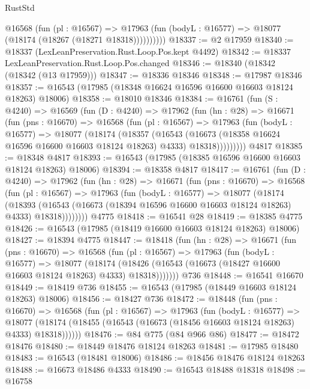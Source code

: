\begin{lexlean}{RustStd}
\begin{coremodule}
            @16568
              (fun (pl : @16567) =>
              @17963 (fun (bodyL : @16577) => @18077 (@18174 (@18267 (@18271 @18318))))))))))
@18337 := @2 @17959
@18340 := @18337 (LexLeanPreservation.Rust.Loop.Pos.kept @4492)
@18342 := @18337 LexLeanPreservation.Rust.Loop.Pos.changed
@18346 := @18340 (@18342 (@18342 (@13 @17959)))
@18347 := @18336 @18346
@18348 := @17987 @18346
@18357 := @16543 (@17985 (@18348 @16624 @16596 @16600 @16603 @18124 @18263) @18006)
@18358 := @18010 @18346
@18384 := @16761
    (fun (S : @4240) =>
    @16569
      (fun (D : @4240) =>
      @17962
        (fun (hn : @28) =>
        @16671
          (fun (pns : @16670) =>
          @16568
            (fun (pl : @16567) =>
            @17963
              (fun (bodyL : @16577) =>
              @18077
                (@18174
                  (@18357
                    (@16543
                      (@16673 (@18358 @16624 @16596 @16600 @16603 @18124 @18263) @4333)
                      @18318)))))))))
    @4817
@18385 := @18348 @4817
@18393 := @16543 (@17985 (@18385 @16596 @16600 @16603 @18124 @18263) @18006)
@18394 := @18358 @4817
@18417 := @16761
    (fun (D : @4240) =>
    @17962
      (fun (hn : @28) =>
      @16671
        (fun (pns : @16670) =>
        @16568
          (fun (pl : @16567) =>
          @17963
            (fun (bodyL : @16577) =>
            @18077
              (@18174
                (@18393
                  (@16543 (@16673 (@18394 @16596 @16600 @16603 @18124 @18263) @4333) @18318))))))))
    @4775
@18418 := @16541 @28
@18419 := @18385 @4775
@18426 := @16543 (@17985 (@18419 @16600 @16603 @18124 @18263) @18006)
@18427 := @18394 @4775
@18447 := @18418
    (fun (hn : @28) =>
    @16671
      (fun (pns : @16670) =>
      @16568
        (fun (pl : @16567) =>
        @17963
          (fun (bodyL : @16577) =>
          @18077
            (@18174
              (@18426 (@16543 (@16673 (@18427 @16600 @16603 @18124 @18263) @4333) @18318)))))))
    @736
@18448 := @16541 @16670
@18449 := @18419 @736
@18455 := @16543 (@17985 (@18449 @16603 @18124 @18263) @18006)
@18456 := @18427 @736
@18472 := @18448
    (fun (pns : @16670) =>
    @16568
      (fun (pl : @16567) =>
      @17963
        (fun (bodyL : @16577) =>
        @18077 (@18174 (@18455 (@16543 (@16673 (@18456 @16603 @18124 @18263) @4333) @18318))))))
@18476 := @84 @775 (@84 @966 @86)
@18477 := @18472 @18476
@18480 := @18449 @18476 @18124 @18263
@18481 := @17985 @18480
@18483 := @16543 (@18481 @18006)
@18486 := @18456 @18476 @18124 @18263
@18488 := @16673 @18486 @4333
@18490 := @16543 @18488 @18318
@18498 := @16758

\end{coremodule}
\end{lexlean}
